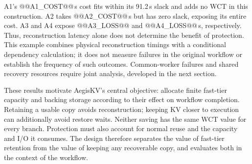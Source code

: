 A1's @@A1_COST@@\,s cost fits within its 91.2\,s slack and adds no WCT
in this construction. A2 takes @@A2_COST@@\,s but has zero slack,
exposing its entire cost. A3 and A4 expose @@A3_LOSS@@ and
@@A4_LOSS@@\,s, respectively. Thus, reconstruction latency alone does
not determine the benefit of protection. This example combines physical
reconstruction timings with a conditional dependency calculation; it
does not measure failures in the original workflow or establish the
frequency of such outcomes. Common-worker failures and shared recovery
resources require joint analysis, developed in the next section.

\label{sec:motivation-goals}
These results motivate AegisKV's central objective: allocate finite
fast-tier capacity and backing storage according to their effect on
workflow completion. Retaining a usable copy avoids reconstruction;
keeping KV closer to execution can additionally avoid restore waits.
Neither saving has the same WCT value for every branch. Protection must also account for normal reuse
and the capacity and I/O it consumes. The design therefore separates the
value of fast-tier retention from the value of keeping any recoverable
copy, and evaluates both in the context of the workflow.
